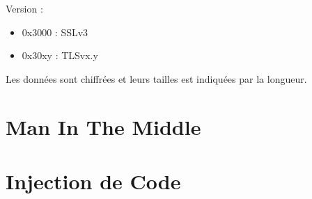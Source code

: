 Version :
\begin{itemize}
\item 0x3000 : SSLv3
\item 0x30xy : TLSvx.y
\end{itemize}

Les données sont chiffrées et leurs tailles est indiquées par
la longueur.

\section{Man In The Middle}
\label{sec:mitm}

\section{Injection de Code}
\label{sec:injCode}





